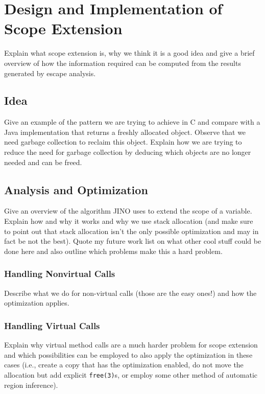 
\chapter{Design and Implementation of Scope Extension}
	\label{chapter:scopeext}
	Explain what scope extension is, why we think it is a good idea and give a brief overview of how the information
	required can be computed from the results generated by escape analysis.

	\section{Idea}
		\label{sec:scopeext:idea}
		Give an example of the pattern we are trying to achieve in C and compare with a Java implementation that returns
		a freshly allocated object. Observe that we need garbage collection to reclaim this object. Explain how we are
		trying to reduce the need for garbage collection by deducing which objects are no longer needed and can be freed.

	\section{Analysis and Optimization}
		\label{sec:scopeext:analysis}
		Give an overview of the algorithm JINO uses to extend the scope of a variable. Explain how and why it works and why
		we use stack allocation (and make sure to point out that stack allocation isn't the only possible optimization and
		may in fact be not the best). Quote my future work list on what other cool stuff could be done here and also outline
		which problems make this a hard problem.

		\subsection{Handling Nonvirtual Calls}
			\label{sub:scopeext:analysis:nonvirtual}
			Describe what we do for non-virtual calls (those are the easy ones!) and how the optimization applies.

		\subsection{Handling Virtual Calls}
			\label{sub:scopeext:analysis:virtual}
			Explain why virtual method calls are a much harder problem for scope extension and which possibilities can be
			employed to also apply the optimization in these cases (i.e., create a copy that has the optimization enabled, do
			not move the allocation but add explicit \texttt{free(3)}s, or employ some other method of automatic region
			inference).
